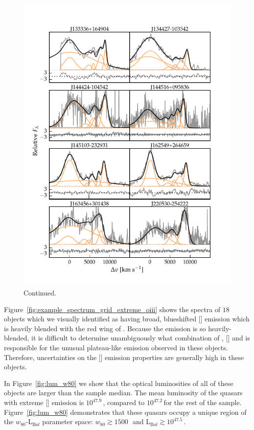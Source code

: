 \begin{figure}
\ContinuedFloat
    \centering
    \includegraphics[width=\columnwidth]{figures/chapter04/example_spectrum_grid_extreme_oiii_2.pdf} 
    \caption[]{Continued.}     
\end{figure}

Figure~\ref{fig:example_spectrum_grid_extreme_oiii} shows the spectra of $18$ objects which we visually identified as having broad, blueshifted [] emission which is heavily blended with the red wing of \hbns. 
Because the emission is so heavily-blended, it is difficult to determine unambiguously what combination of \hbns, [] and  is responsible for the unusual plateau-like emission observed in these objects. 
Therefore, uncertainties on the [] emission properties are generally high in these objects. 

In Figure~\ref{fig:lum_w80} we show that the optical luminosities of all of these objects are larger than the sample median.
The mean luminosity of the quasars with extreme [] emission is $10^{47.9}$\,\ergs, compared to $10^{47.2}$\,\ergs for the rest of the sample. 
Figure~\ref{fig:lum_w80} demonstrates that these quasars occupy a unique region of the $w_{80}$-L$_{\mathrm Bol}$ parameter space: $w_{80}\gtrsim1500$\,\kms\, and L$_{\mathrm Bol}\gtrsim10^{47.5}$\,\ergs. 

